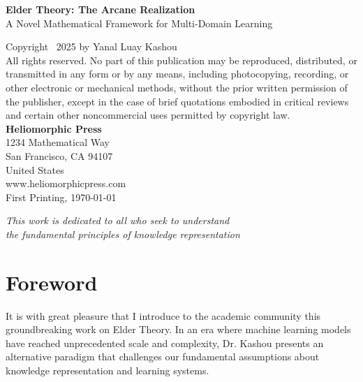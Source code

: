 \documentclass[11pt,twoside]{book}
\newcounter{unit}
\begin{document}
\thispagestyle{empty}
\vspace*{3cm}
\begin{center}
    {\Large\bfseries Elder Theory: The Arcane Realization}\\[2mm]
    {\large A Novel Mathematical Framework for Multi-Domain Learning}
\end{center}

\vspace{2cm}
\noindent
Copyright \textcopyright~2025 by Yanal Luay Kashou\\[5mm]
\noindent
All rights reserved. No part of this publication may be reproduced, distributed, or transmitted in any form or by any means, including photocopying, recording, or other electronic or mechanical methods, without the prior written permission of the publisher, except in the case of brief quotations embodied in critical reviews and certain other noncommercial uses permitted by copyright law.\\[5mm]

\noindent
\textbf{Heliomorphic Press}\\
1234 Mathematical Way\\
San Francisco, CA 94107\\
United States\\
www.heliomorphicpress.com\\[5mm]

\noindent 
First Printing, \today

\vspace{4cm}
\begin{center}
    \textit{This work is dedicated to all who seek to understand\\
    the fundamental principles of knowledge representation}
\end{center}

\newpage

\tableofcontents

\listoffigures

\listoftables

\chapter*{Foreword}

It is with great pleasure that I introduce to the academic community this groundbreaking work on Elder Theory. In an era where machine learning models have reached unprecedented scale and complexity, Dr. Kashou presents an alternative paradigm that challenges our fundamental assumptions about knowledge representation and learning systems.
\end{document}
